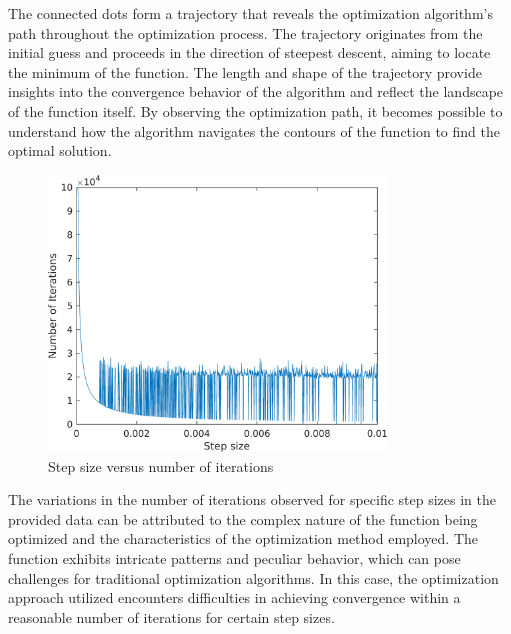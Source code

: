 \documentclass[12pt, a4paper]{article}
\numberwithin{equation}{section}
\begin{document}
The connected dots form a trajectory that reveals the optimization algorithm's path throughout the optimization process. The trajectory originates from the initial guess and proceeds in the direction of steepest descent, aiming to locate the minimum of the function. The length and shape of the trajectory provide insights into the convergence behavior of the algorithm and reflect the landscape of the function itself. By observing the optimization path, it becomes possible to understand how the algorithm navigates the contours of the function to find the optimal solution.
\vspace{10}

\begin{figure}[H]
  \centering
  \includegraphics[width=0.8\textwidth]{img/stepvsnof.png}
  \captionsetup{justification=centering}
  \caption{Step size versus number of iterations}
\end{figure}

The variations in the number of iterations observed for specific step sizes in the provided data can be attributed to the complex nature of the function being optimized and the characteristics of the optimization method employed. The function exhibits intricate patterns and peculiar behavior, which can pose challenges for traditional optimization algorithms. In this case, the optimization approach utilized encounters difficulties in achieving convergence within a reasonable number of iterations for certain step sizes.
\end{document}

